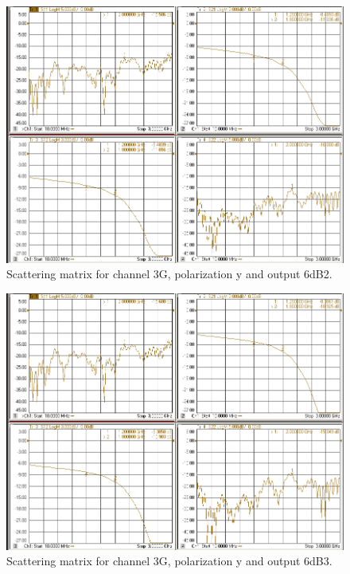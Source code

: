 \documentclass[12pt,a4paper,oneside]{article}
\begin{document}
\begin{figure}[H]
\centering
\includegraphics[width=0.9\linewidth]{VNA_results/3Gy_6dB2.png}
\caption{Scattering matrix for channel 3G, polarization y and output 6dB2.}
\label{fig:3Gy_6dB2}
\end{figure}


\begin{figure}[H]
\centering
\includegraphics[width=0.9\linewidth]{VNA_results/3Gy_6dB3.png}
\caption{Scattering matrix for channel 3G, polarization y and output 6dB3.}
\label{fig:3Gy_6dB3}
\end{figure}
\end{document}
